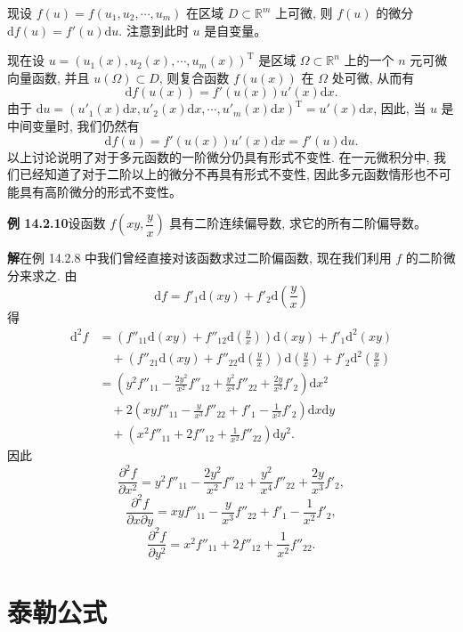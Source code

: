 \documentclass[UTF8, 12pt, fontset=fandol, oneside]{ctexart}
\begin{document}
现设 $f(u)=f(u_1,u_2,\cdots,u_m)$ 在区域 $D\subset\mathbb R^m$ 上可微, 则 $f(u)$ 的微分 $\mathrm df(u)=f'(u)\mathrm du$. 注意到此时 $u$ 是自变量。

现在设 $u=(u_1(x),u_2(x),\cdots,u_m(x))^\mathrm T$ 是区域 $\Omega\subset\mathbb R^n$ 上的一个 $n$ 元可微向量函数, 并且 $u(\Omega)\subset D$, 则复合函数 $f(u(x))$ 在 $\Omega$ 处可微, 从而有
\[
  \mathrm df(u(x))=f'(u(x))u'(x)\mathrm dx.
\]
由于 $\mathrm du=(u'_1(x)\mathrm dx,u'_2(x)\mathrm dx,\cdots,u'_m(x)\mathrm dx)^\mathrm T=u'(x)\mathrm dx$, 因此, 当 $u$ 是中间变量时, 我们仍然有
\[
  \mathrm df(u)=f'(u(x))u'(x)\mathrm dx=f'(u)\mathrm du.
\]
以上讨论说明了对于多元函数的一阶微分仍具有形式不变性. 在一元微积分中, 我们已经知道了对于二阶以上的微分不再具有形式不变性, 因此多元函数情形也不可能具有高阶微分的形式不变性。

\noindent\textbf{例 14.2.10}\quad 设函数 $f\left(xy,\dfrac yx\right)$ 具有二阶连续偏导数, 求它的所有二阶偏导数。

\noindent\textbf{解}\quad 在例 14.2.8 中我们曾经直接对该函数求过二阶偏函数, 现在我们利用 $f$ 的二阶微分来求之. 由
\[
  \mathrm df=f'_1\mathrm d(xy)+f'_2\mathrm d\left(\frac yx\right)
\]
得
\[
\begin{aligned}
  \mathrm d^2f
  &=\left(f''_{11}\mathrm d(xy)+f''_{12}\mathrm d\left(\frac yx\right)\right)\mathrm d(xy)
  +f'_1\mathrm d^2(xy)\\
  &\quad+\left(f''_{21}\mathrm d(xy)+f''_{22}\mathrm d\left(\frac yx\right)\right)
  \mathrm d\left(\frac yx\right)+f'_2\mathrm d^2\left(\frac yx\right)\\
  &=\left(y^2f''_{11}-\frac{2y^2}{x^2}f''_{12}
  +\frac{y^2}{x^4}f''_{22}+\frac{2y}{x^3}f'_2\right)\mathrm dx^2\\
  &\quad+2\left(xyf''_{11}-\frac y{x^3}f''_{22}
  +f'_1-\frac1{x^2}f'_2\right)\mathrm dx\mathrm dy\\
  &\quad+\left(x^2f''_{11}+2f''_{12}+\frac1{x^2}f''_{22}\right)\mathrm dy^2.
\end{aligned}
\]
因此
\[
  \frac{\partial^2 f}{\partial x^2}
  =y^2f''_{11}-\frac{2y^2}{x^2}f''_{12}
  +\frac{y^2}{x^4}f''_{22}+\frac{2y}{x^3}f'_2,
\]
\[
  \frac{\partial^2 f}{\partial x\partial y}
  =xyf''_{11}-\frac y{x^3}f''_{22}
  +f'_1-\frac1{x^2}f'_2,
\]
\[
  \frac{\partial^2 f}{\partial y^2}
  =x^2f''_{11}+2f''_{12}+\frac1{x^2}f''_{22}.
\]

\section{泰勒公式}
\end{document}
